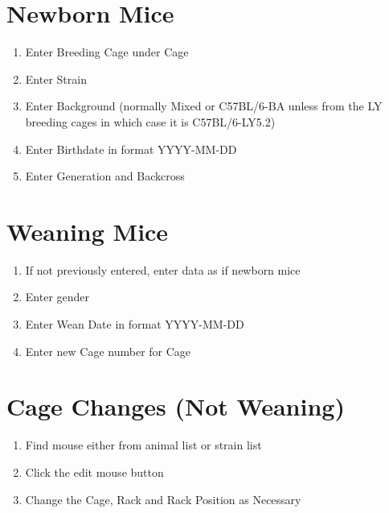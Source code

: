 \documentclass[letterpaper,10pt,english]{sphinxmanual}
\begin{document}
\section{Newborn Mice}
\begin{enumerate}
\item {} 
Enter Breeding Cage under Cage

\item {} 
Enter Strain

\item {} 
Enter Background (normally Mixed or C57BL/6-BA unless from the LY breeding cages in which case it is C57BL/6-LY5.2)

\item {} 
Enter Birthdate in format YYYY-MM-DD

\item {} 
Enter Generation and Backcross

\end{enumerate}


\section{Weaning Mice}
\begin{enumerate}
\item {} 
If not previously entered, enter data as if newborn mice

\item {} 
Enter gender

\item {} 
Enter Wean Date in format YYYY-MM-DD

\item {} 
Enter new Cage number for Cage

\end{enumerate}


\section{Cage Changes (Not Weaning)}
\begin{enumerate}
\item {} 
Find mouse either from animal list or strain list

\item {} 
Click the edit mouse button

\item {} 
Change the Cage, Rack and Rack Position as Necessary

\end{enumerate}
\end{document}
